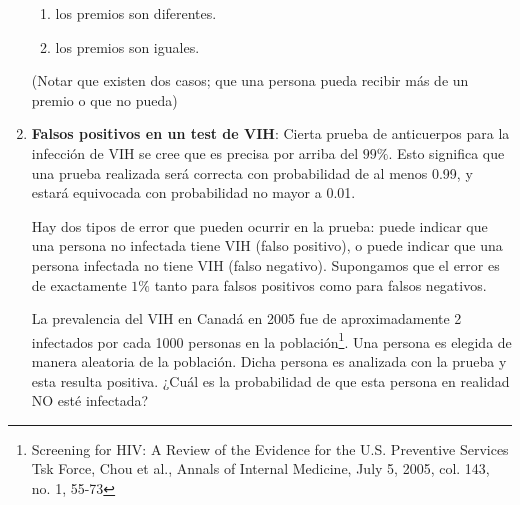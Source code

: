 \documentclass{article}
\begin{document}
\begin{enumerate}
    \begin{enumerate}
        \item los premios son diferentes.
        \item los premios son iguales.
    \end{enumerate}

    (Notar que existen dos casos; que una persona pueda recibir más de un premio o que no pueda)



    \item \textbf{Falsos positivos en un test de VIH}: Cierta prueba de anticuerpos para la infección de VIH se cree que es precisa por arriba del $99\%$. Esto significa que una prueba realizada será correcta con probabilidad de al menos 0.99, y estará equivocada con probabilidad no mayor a 0.01. 
    
    Hay dos tipos de error que pueden ocurrir en la prueba: puede indicar que una persona no infectada tiene VIH (falso positivo), o puede indicar que una persona infectada no tiene VIH (falso negativo). Supongamos que el error es de exactamente $1\%$ tanto para falsos positivos como para falsos negativos.
    
    La prevalencia del VIH en Canadá en 2005 fue de aproximadamente 2 infectados por cada 1000 personas en la población\footnote[1]{Screening for HIV: A Review of the Evidence for the U.S. Preventive Services Tsk Force, Chou et al., Annals of Internal Medicine, July 5, 2005, col. 143, no. 1, 55-73}. Una persona es elegida de manera aleatoria de la población. Dicha persona es analizada con la prueba y esta resulta positiva. ¿Cuál es la probabilidad de que esta persona en realidad NO esté infectada?
\end{enumerate}
\end{document}
